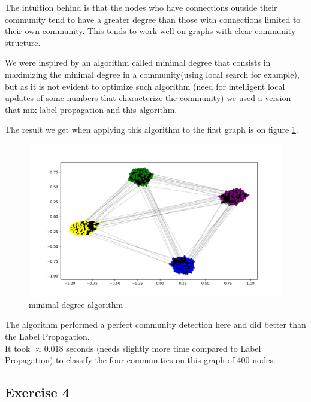 \documentclass{article}
\begin{document}
The intuition behind is that the nodes who have connections outside their
community tend to have a greater degree than those with connections limited to
their own community.
This tends to work well on graphs with clear community structure.

We were inspired by an algorithm called minimal degree that consists in
maximizing the minimal degree in a community(using local search for example),
but as it is not evident to optimize such algorithm (need for intelligent local
updates of some numbers that characterize the community) we used a version that
mix label propagation and this algorithm.

The result we get when applying this algorithm to the first graph is on figure \ref{fig:mindeg}.

\begin{figure}[!ht]
    \centering
    \includegraphics[width=\linewidth]{plots/images1/ex3minimalDegree.pdf}
    \caption{minimal degree algorithm}
    \label{fig:mindeg}
\end{figure}

The algorithm performed a perfect community detection here and did better than
the Label Propagation.\\
It took $\approx 0.018$ seconds (needs slightly more time compared to Label
Propagation) to classify the four communities on this graph of 400 nodes.

\subsection*{Exercise 4}
\end{document}
